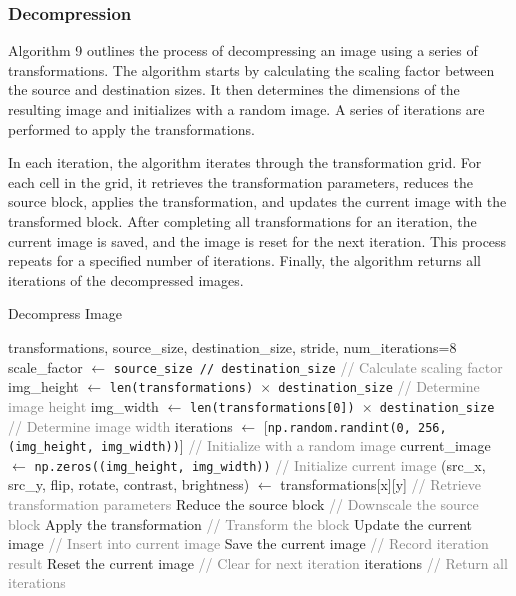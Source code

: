 \documentclass[a4paper,11pt, titlepage]{article}
\theoremstyle{definition}
\theoremstyle{plain}
\theoremstyle{remark}
\theoremstyle{definition}
\begin{document}
\FloatBarrier
\subsubsection{Decompression}

Algorithm 9 outlines the process of decompressing an image using a series of transformations. The algorithm starts by calculating the scaling factor between the source and destination sizes. It then determines the dimensions of the resulting image and initializes with a random image. A series of iterations are performed to apply the transformations.

In each iteration, the algorithm iterates through the transformation grid. For each cell in the grid, it retrieves the transformation parameters, reduces the source block, applies the transformation, and updates the current image with the transformed block. After completing all transformations for an iteration, the current image is saved, and the image is reset for the next iteration. This process repeats for a specified number of iterations. Finally, the algorithm returns all iterations of the decompressed images.
\begin{algorithm}
\caption{Decompress Image}
\begin{algorithmic}[1]
\REQUIRE transformations, source\_size, destination\_size, stride, num\_iterations=8
\STATE scale\_factor $\gets$ \texttt{source\_size // destination\_size} \textcolor{gray}{// Calculate scaling factor}
\STATE img\_height $\gets$ \texttt{len(transformations) $\times$ destination\_size} \textcolor{gray}{// Determine image height}
\STATE img\_width $\gets$ \texttt{len(transformations[0]) $\times$ destination\_size} \textcolor{gray}{// Determine image width}
\STATE iterations $\gets$ [\texttt{np.random.randint(0, 256, (img\_height, img\_width))}] \textcolor{gray}{// Initialize with a random image}
\STATE current\_image $\gets$ \texttt{np.zeros((img\_height, img\_width))} \textcolor{gray}{// Initialize current image}
            \STATE (src\_x, src\_y, flip, rotate, contrast, brightness) $\gets$ transformations[x][y] \textcolor{gray}{// Retrieve transformation parameters}
            \STATE Reduce the source block \textcolor{gray}{// Downscale the source block}
            \STATE Apply the transformation \textcolor{gray}{// Transform the block}
            \STATE Update the current image \textcolor{gray}{// Insert into current image}
        \ENDFOR
    \ENDFOR
    \STATE Save the current image \textcolor{gray}{// Record iteration result}
    \STATE Reset the current image \textcolor{gray}{// Clear for next iteration}
\ENDFOR
\RETURN iterations \textcolor{gray}{// Return all iterations}
\end{algorithmic}
\end{algorithm}
\end{document}
